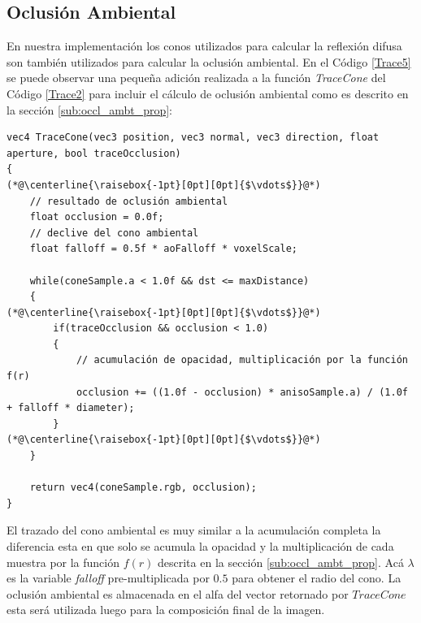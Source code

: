 \subsection{Oclusión Ambiental} %
\label{sub:oclusion_ambient}
En nuestra implementación los conos utilizados para calcular la reflexión difusa son también utilizados para calcular la oclusión ambiental. En el Código \ref{Trace5} se puede observar una pequeña adición realizada a la función \emph{TraceCone} del Código \ref{Trace2} para incluir el cálculo de oclusión ambiental como es descrito en la sección \ref{sub:occl_ambt_prop}:
\\
\begin{lstlisting}[caption={Oclusión ambiental para el algoritmo de trazado de conos.}, label=Trace5]
vec4 TraceCone(vec3 position, vec3 normal, vec3 direction, float aperture, bool traceOcclusion)
{
(*@\centerline{\raisebox{-1pt}[0pt][0pt]{$\vdots$}}@*)
    // resultado de oclusión ambiental
    float occlusion = 0.0f;
    // declive del cono ambiental
    float falloff = 0.5f * aoFalloff * voxelScale;

    while(coneSample.a < 1.0f && dst <= maxDistance)
    {
(*@\centerline{\raisebox{-1pt}[0pt][0pt]{$\vdots$}}@*)
        if(traceOcclusion && occlusion < 1.0)
        {
            // acumulación de opacidad, multiplicación por la función f(r)
            occlusion += ((1.0f - occlusion) * anisoSample.a) / (1.0f + falloff * diameter);
        }
(*@\centerline{\raisebox{-1pt}[0pt][0pt]{$\vdots$}}@*)
    }

    return vec4(coneSample.rgb, occlusion);
}
\end{lstlisting}

El trazado del cono ambiental es muy similar a la acumulación completa la diferencia esta en que solo se acumula la opacidad y la multiplicación de cada muestra por la función $f(r)$ descrita en la sección \ref{sub:occl_ambt_prop}. Acá $\lambda$ es la variable \emph{falloff} pre-multiplicada por $0.5$ para obtener el radio del cono. La oclusión ambiental es almacenada en el alfa del vector retornado por $TraceCone$ esta será utilizada luego para la composición final de la imagen.


